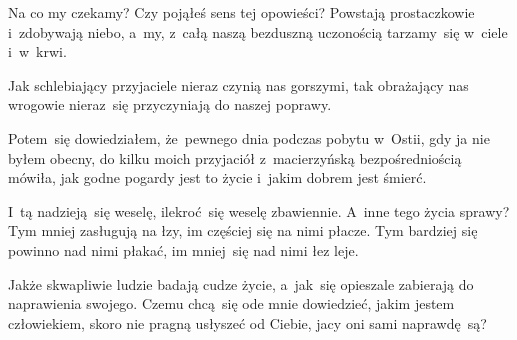 \documentclass[a4paper,11pt]{article}
\begin{document}

\vspace{\spaceThree}



\noindent
Na co my czekamy? Czy pojąłeś sens tej opowieści? Powstają
prostaczkowie i~zdobywają niebo, a~my, z~całą naszą bezduszną
uczonością tarzamy~się w~ciele i~w~krwi.


\vspace{\spaceThree}



\noindent
Jak schlebiający przyjaciele nieraz czynią nas gorszymi, tak
obrażający nas wrogowie nieraz~się przyczyniają do naszej poprawy.


\vspace{\spaceThree}



\noindent
Potem~się dowiedziałem, że~pewnego dnia podczas pobytu w~Ostii,
gdy ja nie byłem obecny, do kilku moich przyjaciół z~macierzyńską
bezpośredniością mówiła, jak godne pogardy jest to życie i~jakim
dobrem jest śmierć.


\vspace{\spaceThree}



\noindent
I~tą nadzieją~się weselę, ilekroć~się weselę zbawiennie. A~inne
tego życia sprawy? Tym mniej zasługują na łzy, im częściej się na nimi
płacze. Tym bardziej się powinno nad nimi płakać, im mniej~się nad
nimi łez leje.


\vspace{\spaceThree}



\noindent
Jakże skwapliwie ludzie badają cudze życie, a~jak~się opieszale
zabierają do naprawienia swojego. Czemu chcą~się ode mnie dowiedzieć,
jakim jestem człowiekiem, skoro nie pragną usłyszeć od Ciebie, jacy
oni sami naprawdę~są?
\end{document}
